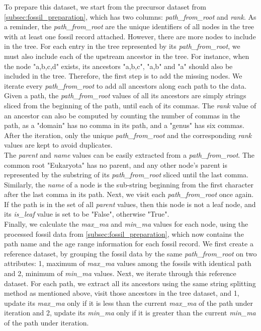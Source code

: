 \documentclass[11pt, a4paper,oneside,chapterprefix=false]{scrbook}
\begin{document}
To prepare this dataset, we start from the precursor dataset from \ref{subsec:fossil_preparation}, which has two columns: \emph{path\_from\_root} and \emph{rank}. As a reminder, the \emph{path\_from\_root} are the unique identifiers of all nodes in the tree with at least one fossil record attached. However, there are more nodes to include in the tree. For each entry in the tree represented by its \emph{path\_from\_root}, we must also include each of the upstream ancestor in the tree. For instance, when the node "a,b,c,d" exists, its ancestors "a,b,c", "a,b" and "a" should also be included in the tree. Therefore, the first step is to add the missing nodes. We iterate every \emph{path\_from\_root} to add all ancestors along each path to the data. Given a path, the \emph{path\_from\_root} values of all its ancestors are simply strings sliced from the beginning of the path, until each of its commas. The \emph{rank} value of an ancestor can also be computed by counting the number of commas in the path, as a "domain" has no comma in its path, and a "genus" has six commas. After the iteration, only the unique \emph{path\_from\_root} and the corresponding \emph{rank} values are kept to avoid duplicates.\\

The \emph{parent} and \emph{name} values can be easily extracted from a \emph{path\_from\_root}. The common root "Eukaryota" has no parent, and any other node's parent is represented by the substring of its \emph{path\_from\_root} sliced until the last comma. Similarly, the \emph{name} of a node is the sub-string beginning from the first character after the last comma in its path. Next, we visit each \emph{path\_from\_root} once again. If the path is in the set of all \emph{parent} values, then this node is not a leaf node, and its \emph{is\_leaf} value is set to be "False", otherwise "True". \\

Finally, we calculate the \emph{max\_ma} and \emph{min\_ma} values for each node, using the processed fossil data from \ref{subsec:fossil_preparation}, which now contains the path name and the age range information for each fossil record. We first create a reference dataset, by grouping the fossil data by the same \emph{path\_from\_root} on two attributes: 1, maximum of \emph{max\_ma} values among the fossils with identical path and 2, minimum of \emph{min\_ma} values. Next, we iterate through this reference dataset. For each path, we extract all its ancestors using the same string splitting method as mentioned above, visit those ancestors in the tree dataset, and 1, update its \emph{max\_ma} only if it is less than the current \emph{max\_ma} of the path under iteration and 2, update its \emph{min\_ma} only if it is greater than the current \emph{min\_ma} of the path under iteration.
\end{document}
